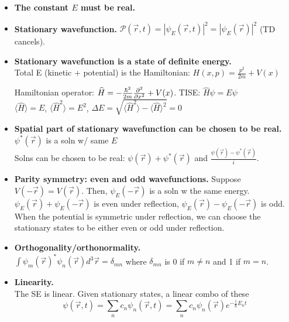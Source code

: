 \begin{itemize}[noitemsep,wide=0pt, leftmargin=\dimexpr{} + 2\relax]
    \item \textbf{The constant $E$ must be real.}
    
    \item \textbf{Stationary wavefunction.}
        $\mathcal{P}(\vec{r}, t) = |\psi_E(\vec{r}, t)|^2 = |\psi_E(\vec{r})|^2$ (TD cancels).

    \item \textbf{Stationary wavefunction is a state of definite energy.} \\
        Total E (kinetic + potential) is the Hamiltonian: $H(x, p) = \frac{p^2}{2m} + V(x)$

        Hamiltonian operator: $\widehat{H} = -\frac{\hbar^2}{2m} \pdv[2]{}{x} + V(x)$.
        TISE: $\widehat{H} \psi = E \psi$ \\

        $\langle \widehat{H} \rangle = E$, $\langle \widehat{H} ^2 \rangle = E^2$, $\Delta E = \sqrt{\langle \widehat{H}^2 \rangle - \langle \widehat{H} \rangle ^2} = 0$

    \item \textbf{Spatial part of stationary wavefunction can be chosen to be real.} \\
        $\psi^*(\vec{r})$ is a soln w/ same $E$ \\
        Solns can be chosen to be real: $\psi(\vec{r}) + \psi^*(\vec{r})$ and $\frac{\psi(\vec{r}) - \psi^*(\vec{r})}{i}$.

    \item \textbf{Parity symmetry: even and odd wavefunctions.}
        Suppose $V(-\vec{r}) = V(\vec{r})$. Then, $\psi_E(-\vec{r})$ is a soln w the same energy. \\
        $\psi_E(\vec{r}) + \psi_E(-\vec{r})$ is even under reflection, $\psi_E(\vec{r}) - \psi_E(-\vec{r})$ is odd. \\
        When the potential is symmetric under reflection, we can choose the stationary states to be either even or odd under reflection.

    \item \textbf{Orthogonality/orthonormality.} \\
        $\int \psi_m (\vec{r})^* \psi_n (\vec{r}) d^3 \vec{r} = \delta_{mn}$ where $\delta_{mn}$ is 0 if $m \neq n$ and 1 if $m = n$.

    \item \textbf{Linearity.} \\
        The SE is linear. Given stationary states, a linear combo of these
            $$\psi(\vec{r}, t) = \sum_{n} c_n \psi_n(\vec{r}, t) = \sum_n c_n \psi_n(\vec{r}) e^{-\frac{i}{\hbar} E_n t}$$


\end{itemize}
